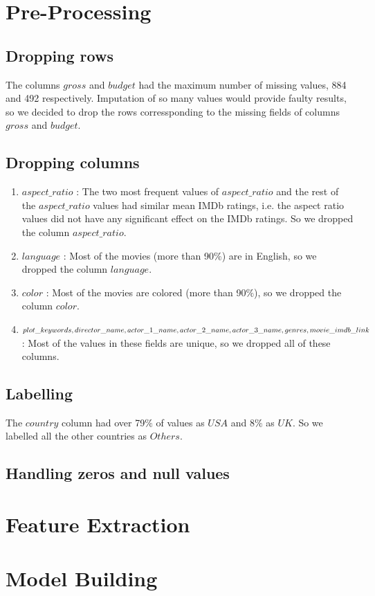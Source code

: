 \documentclass[conference]{IEEEtran}
\begin{document}
\section{Pre-Processing}
\subsection{Dropping rows}
The columns $gross$ and $budget$ had the maximum number of missing values, 884 and 492 respectively. Imputation of so many values would provide faulty results, so we decided to drop the rows corressponding to the missing fields of columns $gross$ and $budget$.
\subsection{Dropping columns}
	\begin{enumerate}
		\item $aspect\_ratio$ : The two most frequent values of $aspect\_ratio			$ and the rest of the $aspect\_ratio$ values had similar mean IMDb 				ratings, i.e. the aspect ratio values did not have any significant effect on the IMDb ratings. So we dropped the column $aspect\_ratio$.
		\item $language$ : Most of the movies (more than 90$\%$) are in 				English, so we dropped the column $language$.
		\item $color$ : Most of the movies are colored (more than 90$\%$), so 			we dropped the column $color$.
		\item $plot\_keywords, director\_name, actor\_1\_name, \\ actor					\_2\_name,			actor\_3\_name, genres,\\ movie\_imdb\_link$ : 				Most 			of the values in 				these fields are 				unique, so we dropped 		all of these columns.
	\end{enumerate}
\subsection{Labelling}
The $country$ column had over 79$\%$ of values as $USA$ and 8$\%$ as $UK$. So we labelled all the other countries as $Others$.
\subsection{Handling zeros and null values}



\section{Feature Extraction}
\section{Model Building}
\newpage


\end{document}
